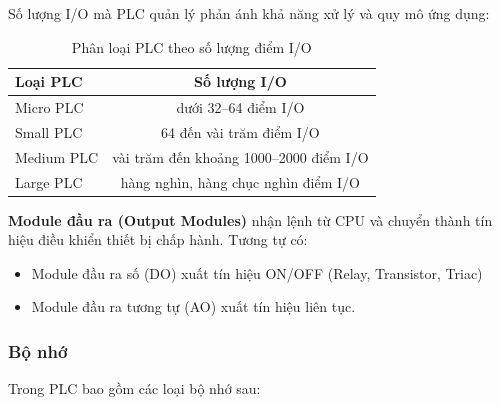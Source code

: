 \documentclass[../main.tex]{subfiles}
\begin{document}
Số lượng I/O mà PLC quản lý phản ánh khả năng xử lý và quy mô ứng dụng:

\begin{table}[htbp]
    \centering
    \caption{Phân loại PLC theo số lượng điểm I/O}
    \label{tab:plc-io-scale}
    \begin{tabular}{|l|c|}
        \hline
        \textbf{Loại PLC} & \textbf{Số lượng I/O} \\
        \hline
        Micro PLC & dưới 32--64 điểm I/O \\
        \hline
        Small PLC & 64 đến vài trăm điểm I/O \\
        \hline
        Medium PLC & vài trăm đến khoảng 1000--2000 điểm I/O \\
        \hline
        Large PLC & hàng nghìn, hàng chục nghìn điểm I/O \\
        \hline
    \end{tabular}
\end{table}

\textbf{Module đầu ra (Output Modules)} nhận lệnh từ CPU và chuyển thành tín hiệu điều khiển thiết bị chấp hành. Tương tự có:

\begin{itemize}
    \item Module đầu ra số (DO) xuất tín hiệu ON/OFF (Relay, Transistor, Triac)
    \item Module đầu ra tương tự (AO) xuất tín hiệu liên tục.
\end{itemize} 


\subsubsection{Bộ nhớ}

Trong PLC bao gồm các loại bộ nhớ sau:
\end{document}
